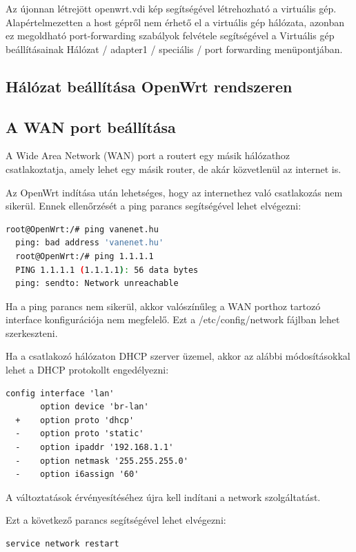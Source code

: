 \documentclass[12pt]{article}
\begin{document}
Az újonnan létrejött openwrt.vdi kép segítségével létrehozható a virtuális gép. Alapértelmezetten a host gépről nem érhető el a virtuális gép hálózata, azonban ez megoldható port-forwarding szabályok felvétele segítségével a Virtuális gép beállításainak Hálózat / adapter1 / speciális / port forwarding menüpontjában.

\newpage

\subsection{Hálózat beállítása OpenWrt rendszeren}

\subsection{A WAN port beállítása}

A Wide Area Network (WAN) port a routert egy másik hálózathoz csatlakoztatja, amely lehet egy másik router, de akár közvetlenül az internet is.

Az OpenWrt indítása után lehetséges, hogy az internethez való csatlakozás nem sikerül. Ennek ellenőrzését a ping parancs segítségével lehet elvégezni:

\begin{lstlisting}[language=Bash]
  root@OpenWrt:/# ping vanenet.hu
  ping: bad address 'vanenet.hu'
  root@OpenWrt:/# ping 1.1.1.1
  PING 1.1.1.1 (1.1.1.1): 56 data bytes
  ping: sendto: Network unreachable
\end{lstlisting}

Ha a ping parancs nem sikerül, akkor valószínűleg a WAN porthoz tartozó interface konfigurációja nem megfelelő. Ezt a /etc/config/network fájlban lehet szerkeszteni.

Ha a csatlakozó hálózaton DHCP szerver üzemel, akkor az alábbi módosításokkal lehet a DHCP protokollt engedélyezni:

\begin{lstlisting}[]
  config interface 'lan'
       option device 'br-lan'
  +    option proto 'dhcp'
  -    option proto 'static'
  -    option ipaddr '192.168.1.1'
  -    option netmask '255.255.255.0'
  -    option i6assign '60'
\end{lstlisting}

A változtatások érvényesítéséhez újra kell indítani a network szolgáltatást.

Ezt a következő parancs segítségével lehet elvégezni:

\begin{lstlisting}[language=Bash]
   service network restart
\end{lstlisting}
\end{document}

